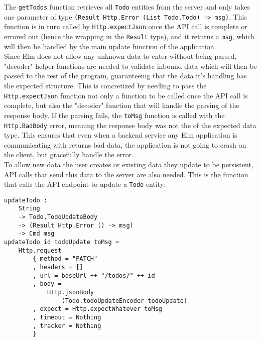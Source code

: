 The \texttt{getTodos} function retrieves all \texttt{Todo} entities from the server and only takes one parameter of type \texttt{(Result Http.Error (List Todo.Todo) -> msg)}. This function is in turn called by \texttt{Http.expectJson} once the API call is complete or errored out (hence the wrapping in the \texttt{Result} type), and it returns a \texttt{msg}, which will then be handled by the main update function of the application.\\

Since Elm does not allow any unknown data to enter without being parsed, "decoder" helper functions are needed to validate inbound data which will then be passed to the rest of the program, guaranteeing that the data it's handling has the expected structure. This is concretized by needing to pass the \texttt{Http.expectJson} function not only a function to be called once the API call is complete, but also the "decoder" function that will handle the parsing of the response body. If the parsing fails, the \texttt{toMsg} function is called with the \texttt{Http.BadBody} error, meaning the response body was not the of the expected data type. This ensures that even when a backend service any Elm application is communicating with returns bad data, the application is not going to crash on the client, but gracefully handle the error.\\

To allow new data the user creates or existing data they update to be persistent, API calls that send this data to the server are also needed. This is the function that calls the API endpoint to update a \texttt{Todo} entity:

\begin{verbatim}
updateTodo :
    String
    -> Todo.TodoUpdateBody
    -> (Result Http.Error () -> msg)
    -> Cmd msg
updateTodo id todoUpdate toMsg =
    Http.request
        { method = "PATCH"
        , headers = []
        , url = baseUrl ++ "/todos/" ++ id
        , body =
            Http.jsonBody
                (Todo.todoUpdateEncoder todoUpdate)
        , expect = Http.expectWhatever toMsg
        , timeout = Nothing
        , tracker = Nothing
        }
\end{verbatim}

